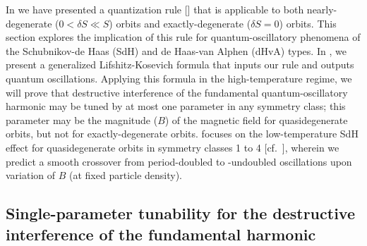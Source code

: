 \documentclass[aps, prb, showpacs, twocolumn, notitlepage, superscriptaddress]{revtex4-1}
\begin{document}
In  we have presented a quantization rule [] that is applicable to both nearly-degenerate ($0{<}\delta S{\ll}S$) orbits and exactly-degenerate ($\delta S{=}0$) orbits. This section explores the implication of this rule for quantum-oscillatory phenomena of the Schubnikov-de Haas (SdH)\cite{SdH} and de Haas-van Alphen (dHvA)\cite{dHvA} types. In , we present a generalized Lifshitz-Kosevich formula\cite{lifshitz_kosevich,lifshitz_kosevich_jetp} that inputs our rule and outputs quantum oscillations. Applying this formula in the high-temperature regime, we will prove that  destructive interference of the fundamental quantum-oscillatory harmonic may  be tuned by at most one parameter in any symmetry class; this parameter may be the magnitude ($B$) of the magnetic field for quasidegenerate orbits, but not for exactly-degenerate orbits.  focuses on the low-temperature SdH effect for quasidegenerate orbits in symmetry classes 1 to 4 [cf.\ ], wherein we predict a smooth crossover from period-doubled to -undoubled oscillations upon variation of $B$ (at fixed particle density).






\subsection{Single-parameter tunability for the destructive interference of the fundamental harmonic}\label{sec:quantosc_equidis}

\end{document}
